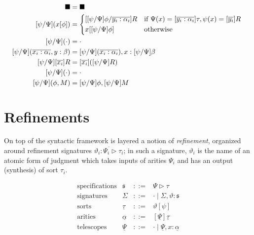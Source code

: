 \documentclass{article}
\renewcommand\vec[1]{\overline{#1}}
\newcommand\Ul[1]{\underline{#1}}
\newcommand\SORT{\blacksquare}
\newcommand\Ar[2]{[#1]#2}
\newcommand\TlNil{\cdot}
\newcommand\TlSnoc[3]{#1,#2:#3}
\newcommand\SpNil{\cdot}
\newcommand\SpSnoc[2]{#1,#2}
\newcommand\Ap[2]{#1[#2]}
\newcommand\Abs[2]{[#1]#2}
\newcommand\HSubst[3]{[#1/#2]#3}
\begin{document}
\begin{align*}
  \HSubst{\psi}{\Psi}{\SORT}
  &=
  \SORT
  \\
  \HSubst{\psi}{\Psi}{(\Ap{x}{\phi})}
  &=
  \begin{cases*}
    \HSubst{
      \HSubst{\psi}{\Psi}{\phi}
    }{\vec{y_i:\alpha_i}}{R} 
    &if $\Psi(x)=\Ar{\vec{y_i:\alpha_i}}{\tau}, \psi(x)=\Abs{\vec{y_i}}{R}$
    \\
    \Ap{x}{
      \HSubst{\psi}{\Psi}{\phi}
    }
    &otherwise
  \end{cases*}
  \\
  \HSubst{\psi}{\Psi}{(\TlNil)}
  &=
  \TlNil
  \\
  \HSubst{\psi}{\Psi}{(\TlSnoc{\vec{x_i:\alpha_i}}{y}{\beta})}
  &=
  \TlSnoc{
    \HSubst{\psi}{\Psi}{(\vec{x_i:\alpha_i})}
  }{x}{
    \HSubst{\psi}{\Psi}{\beta}
  }
  \\
  \HSubst{\psi}{\Psi}{\Abs{\vec{x_i}}{R}}
  &=
  \Abs{\vec{x_i}}{
    (\HSubst{\psi}{\Psi}{R})
  }
  \\
  \HSubst{\psi}{\Psi}{(\SpNil)}
  &=
  \SpNil
  \\
  \HSubst{\psi}{\Psi}{(\SpSnoc{\phi}{M})}
  &=
  \SpSnoc{\HSubst{\psi}{\Psi}{\phi}}{\HSubst{\psi}{\Psi}{M}}
\end{align*}

\section{Refinements}

\newcommand\Spec[2]{{#1}\triangleright{#2}}
\newcommand\SigNil{\cdot}
\newcommand\SigSnoc[3]{#1,#2:#3}

\newcommand\RfSig[2]{{#1}\vdash{#2}\;\textit{sig}}
\newcommand\RfSpec[2]{{#1}\vdash{#2}\;\textit{spec}}
\newcommand\RfSrt[4]{#1\mathrel{\vdash_{#2}}{#3}\sqsubset{#4}}
\newcommand\RfAr[4]{#1\mathrel{\vdash_{#2}}{#3}\sqsubset{#4}}
\newcommand\RfTl[4]{#1\mathrel{\vdash_{#2}}{#3}\sqsubset{#4}}

On top of the syntactic framework is layered a notion of
\emph{refinement}, organized around refinement signatures
$\vec{\vartheta_i:\Spec{\Psi_i}{\tau_i}}$; in such a signature,
$\vartheta_i$ is the name of an atomic form of judgment which takes
inputs of arities $\Psi_i$ and has an output (synthesis) of sort
$\tau_i$.

\[
  \begin{array}{llll}
    \text{specifications}
    &\mathfrak{s}
    &::=
    &\Spec{\Psi}{\tau}
    \\
    \text{signatures}
    &\Sigma
    &::=
    &\SigNil\mid\SigSnoc{\Sigma}{\vartheta}{\mathfrak{s}}
    \\
    \text{sorts}
    &\Ul{\tau}
    &::=
    &\Ap{\vartheta}{\psi}
    \\
    \text{arities}
    &\Ul{\alpha}
    &::=
    &\Ar{\Ul{\Psi}}{\Ul{\tau}}
    \\
    \text{telescopes}
    &\Ul{\Psi}
    &::=
    &\TlNil\mid\TlSnoc{\Ul{\Psi}}{x}{\Ul{\alpha}}
  \end{array}
\]
\end{document}
